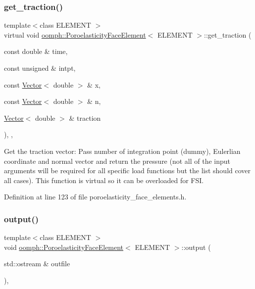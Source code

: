 \subsubsection{\texorpdfstring{get\+\_\+traction()}{get\_traction()}}
{\footnotesize\ttfamily template$<$class E\+L\+E\+M\+E\+NT $>$ \\
virtual void \hyperlink{classoomph_1_1PoroelasticityFaceElement}{oomph\+::\+Poroelasticity\+Face\+Element}$<$ E\+L\+E\+M\+E\+NT $>$\+::get\+\_\+traction (\begin{DoxyParamCaption}\item[{const double \&}]{time,  }\item[{const unsigned \&}]{intpt,  }\item[{const \hyperlink{classoomph_1_1Vector}{Vector}$<$ double $>$ \&}]{x,  }\item[{const \hyperlink{classoomph_1_1Vector}{Vector}$<$ double $>$ \&}]{n,  }\item[{\hyperlink{classoomph_1_1Vector}{Vector}$<$ double $>$ \&}]{traction }\end{DoxyParamCaption})\hspace{0.3cm}{\ttfamily [inline]}, {\ttfamily [protected]}, {\ttfamily [virtual]}}



Get the traction vector\+: Pass number of integration point (dummy), Eulerlian coordinate and normal vector and return the pressure (not all of the input arguments will be required for all specific load functions but the list should cover all cases). This function is virtual so it can be overloaded for F\+SI. 



Definition at line 123 of file poroelasticity\+\_\+face\+\_\+elements.\+h.

\mbox{\label{classoomph_1_1PoroelasticityFaceElement_a9a9f13d76e62d8d7035af1a96804170f}} 
\subsubsection{\texorpdfstring{output()}{output()}\hspace{0.1cm}{\footnotesize\ttfamily [1/4]}}
{\footnotesize\ttfamily template$<$class E\+L\+E\+M\+E\+NT $>$ \\
void \hyperlink{classoomph_1_1PoroelasticityFaceElement}{oomph\+::\+Poroelasticity\+Face\+Element}$<$ E\+L\+E\+M\+E\+NT $>$\+::output (\begin{DoxyParamCaption}\item[{std\+::ostream \&}]{outfile }\end{DoxyParamCaption})\hspace{0.3cm}{\ttfamily [inline]}, {\ttfamily [virtual]}}



